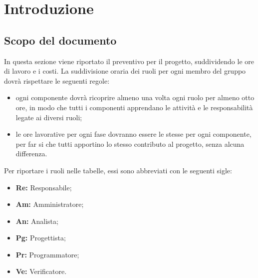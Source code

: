 \section{Introduzione}\label{section:introduzione}

\subsection{Scopo del documento}
In questa sezione viene riportato il preventivo per il progetto, suddividendo le ore di lavoro e i costi.
La suddivisione oraria dei ruoli per ogni membro del gruppo dovrà rispettare le seguenti regole:
\begin{itemize}
	\item ogni componente dovrà ricoprire almeno una volta ogni ruolo per almeno otto ore, in modo che tutti i componenti apprendano le attività e le responsabilità legate ai diversi ruoli;
	\item le ore lavorative per ogni fase dovranno essere le stesse per ogni componente, per far si che tutti apportino lo stesso contributo al progetto, senza alcuna differenza.
\end{itemize}
Per riportare i ruoli nelle tabelle, essi sono abbreviati con le seguenti sigle:
\begin{itemize}
	\item\textbf{Re:} Responsabile;
	\item\textbf{Am:} Amministratore;
	\item\textbf{An:} Analista;
	\item\textbf{Pg:} Progettista;
	\item\textbf{Pr:} Programmatore;
	\item\textbf{Ve:} Verificatore.
\end{itemize}



